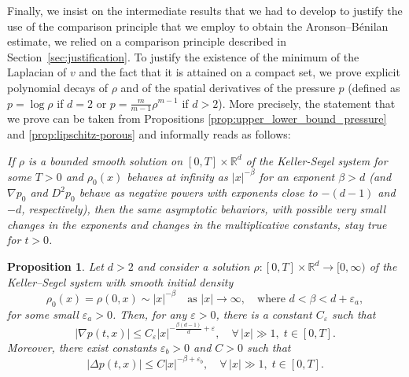 \documentclass[11pt,a4paper]{article}
\numberwithin{equation}{section}
\newcommand{\R}{{\mathbb{R}}}
\theoremstyle{plain}
\newtheorem{proposition}[theorem]{Proposition}
\theoremstyle{remark}
\begin{document}
Finally, we insist on the intermediate results that we had to develop to justify the use of the comparison principle that we employ to obtain the Aronson--B\'enilan estimate, we relied on a comparison principle described in Section~\ref{sec:justification}.
To justify the existence of the minimum of the Laplacian of $v$ and the fact that it is attained on a compact set, we prove explicit polynomial decays of $\rho$ and of the spatial derivatives of the pressure $p$ (defined as $p=\log\rho$ if $d=2$ or $p=\frac{m}{m-1}\rho^{m-1}$ if $d>2$). More precisely, the statement that we prove can be taken from Propositions \ref{prop:upper_lower_bound_pressure} and \ref{prop:lipschitz-porous} and informally reads as follows:

{\it If $\rho$ is a bounded smooth solution on $[0,T]\times\R^d$ of the Keller-Segel system for some $T>0$ and $\rho_0(x)$ behaves at infinity as $ |x|^{-\beta}$ for an exponent $\beta>d$ (and $\nabla p_0$ and $D^2p_0$ behave as negative powers with exponents close to $-(d-1)$ and $-d$, respectively), then the same asymptotic behaviors, with possible very small changes in the exponents and changes in the multiplicative constants, stay true for $t>0$.}

\iffalse
\begin{proposition}
Let $d > 2$ and consider a solution $\rho:[0,T]\times\mathbb R^d\to[0,\infty)$ of the Keller--Segel system with smooth initial density
\[
\rho_0(x)=\rho(0,x)\sim |x|^{-\beta}\quad\text{as }|x|\to\infty,\quad \text{where } d<\beta<d+\varepsilon_a,
\]
for some small $\varepsilon_a>0$. Then, for any $\varepsilon>0$, there is a constant $C_\varepsilon$ such that
\[
|\nabla p(t,x)|\le C_\varepsilon |x|^{-\frac{\beta(d-1)}{d}+\varepsilon},\quad\forall\,|x|\gg 1,\; t\in[0,T].
\]
Moreover, there exist constants $\varepsilon_b>0$ and $C >0$ such that
\[
|\Delta p(t,x)|\le C |x|^{-\beta+\varepsilon_b},\quad\forall\,|x|\gg 1,\; t\in[0,T].
\]
\end{proposition}
\end{document}
